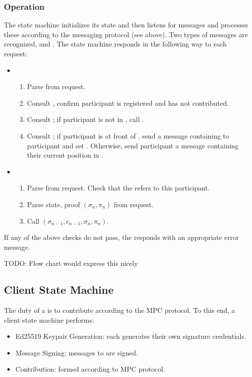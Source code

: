 \subsubsection*{Operation}
The \Coordinator{} state machine initializes its state and then listens for messages and processes these according to the messaging protocol (see above). Two types of messages are recognized, \QueryRequest{} and \UpdateRequest{}. The state machine responds in the following way to each request:
\begin{itemize}
    \item \QueryRequest{}
    \begin{enumerate}
        \item Parse \ParticipantId{} from request. 
        \item Consult \Registry{}, confirm participant is registered and has not contributed. 
        \item Consult \Queue{}; if participant is not in \Queue{}, call \enqueue{}.
        \item Consult \Queue{}; if participant is at front of \Queue{}, send a message containing \MpcState{} to participant and set \TimedLock{}. Otherwise, send participant a message containing their current position in \Queue{}.
    \end{enumerate}
    \item \UpdateRequest{}
    \begin{enumerate}
        \item Parse \ParticipantId{} from request. Check that the \TimedLock{} refers to this participant.
        \item Parse state, proof $(\sigma_n, \pi_n)$ from request. 
        \item Call \update{}$(\sigma_{n-1}, c_{n-1}, \sigma_n, \pi_n)$.
    \end{enumerate}
\end{itemize}
If any of the above checks do not pass, the \Coordinator{} responds with an appropriate error message.

TODO: Flow chart would express this nicely

\subsection{Client State Machine}

The duty of a \Contributor{} is to contribute according to the MPC protocol. To this end, a client state machine performs:
\begin{itemize}
    \item Ed25519 Keypair Generation: each \Contributor{} generates their own signature credentials.
    \item Message Signing: messages to \Coordinator{} are signed.
    \item Contribution: formed according to MPC protocol.
\end{itemize}

